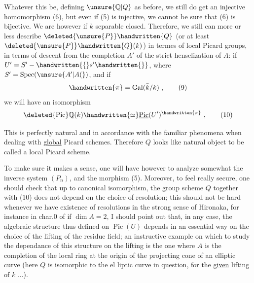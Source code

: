 Whatever this be, defining $\unsure{\mathbb{Q}|Q}$ as before, we still do get an injective homomorphism (6), but even if (5) is injective, we cannot be sure that (6) is bijective. We are however if $k$  separable closed. Therefore, we still  can more or less describe $\deleted{\unsure{P}}\handwritten{Q}$ (or at least $\deleted{\unsure{P}}\handwritten{Q}(k)$) in termes of local Picard groups, in terms of  descent from the completion $A'$ of the strict henselization of $A$: if $U'=S'-\handwritten{\{}s'\handwritten{\}}$, where $S'=\operatorname{Spec}(\unsure{A'|A(})$, and if
\[
\handwritten{\pi}=\operatorname{Gal}(\bar{k}/k)\ ,
\tag*{(9)}
\]
we will have an isomorphism
\[
\deleted{\operatorname{Pic}}\mathbb{Q}(k)\handwritten{\simeq}\underline{\operatorname{Pic}}(U')^{\handwritten{\pi}}\ ,
\tag*{(10)}
\]

This is perfectly natural and in accordance with the familiar phenomena when dealing with \uline{global} Picard schemes. Therefore $Q$ looks like  natural object to be called a  local Picard scheme.

To make sure it makes a sense, one will have however to analyze somewhat the inverse system $(P_n)$, and the morphism (5). Moreover, to feel really secure, one should check that up to canonical isomorphism, the group scheme $Q$ together with (10) does not depend on the choice of
 resolution; this should not be hard whenever we have existence of resolutions in the strong sense of Hironaka, for instance in char.$0$ of if $\dim A=2$,  I should point out that, in any case, the algebraic structure thus defined on $\operatorname{Pic}(U)$ depends in an essential way on the choice of the lifting of the residue field; an instructive example on which to study the dependance of this structure on the lifting is the one where $A$ is the completion of the local ring at the origin of the projecting cone of an elliptic curve (here $Q$ is isomorphic to the el liptic curve in question, for the \uline{given} lifting of $k$ ...).

